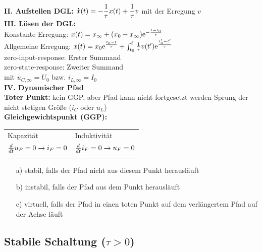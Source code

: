 \documentclass[fs, footer]{latex4ei}
\begin{document}
\begin{multicols*}{4}
{	\textbf{II. Aufstellen DGL:} $\accentset{\mbox{\textrm{\large\bfseries .}} }{x}(t) = - \dfrac{1}{\tau}x(t) + \dfrac{1}{\tau}v$ mit der Erregung $v$\\
	\textbf{III. Lösen der DGL:}\\
	Konstante Erregung:  $x(t) = x_\infty + (x_0 - x_\infty )\mathrm{e}^{-\frac{t-t_0}{\tau}}$ \\
	Allgemeine Erregung: $x(t) = x_0\mathrm{e}^{\frac{t_0-t}{\tau}}+\int_{t_0}^t{\frac{1}{\tau}v(t')\mathrm{e}^{\frac{t'_0-t'}{\tau}}} $ \\
	zero-input-response: Erster Summand\\
	zero-state-response: Zweiter Summand\\
	mit $u_{C,\infty}=U_0$ bzw. $i_{L,\infty}=I_0$\\
	\textbf{IV. Dynamischer Pfad}\\
\textbf{Toter Punkt:} kein GGP, aber Pfad kann nicht fortgesetzt werden \ra Sprung der nicht stetigen Größe ($i_C$ oder $u_L$)\\
\textbf{Gleichgewichtspunkt (GGP):}\\
	\begin{tabular*}{\columnwidth}{@{\extracolsep\fill}ll@{}}
		Kapazität & Induktivität\\ \mrule
		$\frac{d}{dt}u_F = 0 \rightarrow i_F = 0$ & $\frac{d}{dt}i_F = 0 \rightarrow u_F = 0$\\
		\mrule	
	\end{tabular*}
\begin{itemize}
	\item[a)] stabil, falls der Pfad nicht aus diesem Punkt herausläuft
	\item[b)] instabil, falls der Pfad aus dem Punkt herausläuft
	\item[c)] virtuell, falls der Pfad in einen toten Punkt auf dem verlängertem Pfad auf der Achse läuft
\end{itemize}
}

\subsection{Stabile Schaltung ($\tau > 0$)}

\end{multicols*}
\end{document}
